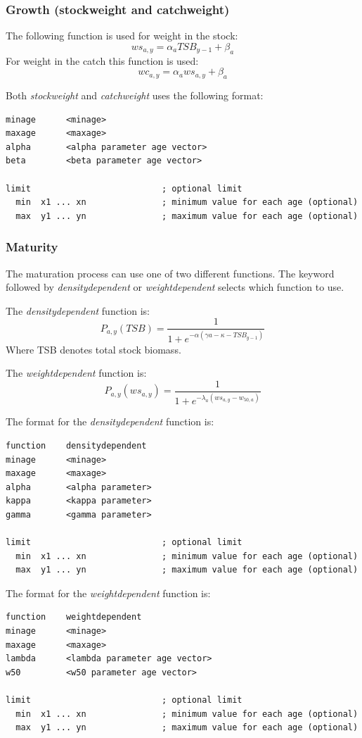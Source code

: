 \documentclass[12pt,twoside,a4paper]{article}
\begin{document}
\subsubsection{Growth (stockweight and catchweight)}

The following function is used for weight in the stock:
\[ws_{a,y}=\alpha_a TSB_{y-1}+\beta_a\]
For weight in the catch this function is used:
\[wc_{a,y}=\alpha_a ws_{a,y}+\beta_a\]

Both \emph{stockweight} and \emph{catchweight} uses the following
format:
\begin{verbatim}
minage      <minage>
maxage      <maxage>
alpha       <alpha parameter age vector>
beta        <beta parameter age vector>

limit                          ; optional limit  
  min  x1 ... xn               ; minimum value for each age (optional)
  max  y1 ... yn               ; maximum value for each age (optional)
\end{verbatim}


\subsubsection{Maturity}
The maturation process can use one of two different functions.
The  keyword followed by \emph{densitydependent} or
\emph{weightdependent} selects which function to use.

The \emph{densitydependent} function is:
\[
P_{a,y}(TSB)=\frac{1}
             {1+e^{-\alpha(\gamma a-\kappa-TSB_{y-1})}}
\]
Where TSB denotes total stock biomass. 

The \emph{weightdependent} function is:
\[
P_{a,y}(ws_{a,y})=\frac{1}
                {1+e^{-\lambda_a(ws_{a,y}-w_{{50},a})}}
\]

The format for the \emph{densitydependent} function is:
\begin{verbatim}
function    densitydependent
minage      <minage>
maxage      <maxage>
alpha       <alpha parameter>  
kappa       <kappa parameter>  
gamma       <gamma parameter>  

limit                          ; optional limit  
  min  x1 ... xn               ; minimum value for each age (optional)
  max  y1 ... yn               ; maximum value for each age (optional)
\end{verbatim}

The format for the \emph{weightdependent} function is:
\begin{verbatim}
function    weightdependent
minage      <minage>
maxage      <maxage>
lambda      <lambda parameter age vector>
w50         <w50 parameter age vector>

limit                          ; optional limit  
  min  x1 ... xn               ; minimum value for each age (optional)
  max  y1 ... yn               ; maximum value for each age (optional)
\end{verbatim}
\end{document}
